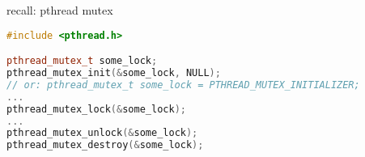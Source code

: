 
\begin{frame}[fragile,label=pthreadMutexBasic]{recall: pthread mutex}
\begin{lstlisting}[language=C++,style=small]
#include <pthread.h>

pthread_mutex_t some_lock;
pthread_mutex_init(&some_lock, NULL);
// or: pthread_mutex_t some_lock = PTHREAD_MUTEX_INITIALIZER;
...
pthread_mutex_lock(&some_lock);
...
pthread_mutex_unlock(&some_lock);
pthread_mutex_destroy(&some_lock);
\end{lstlisting}
\end{frame}

